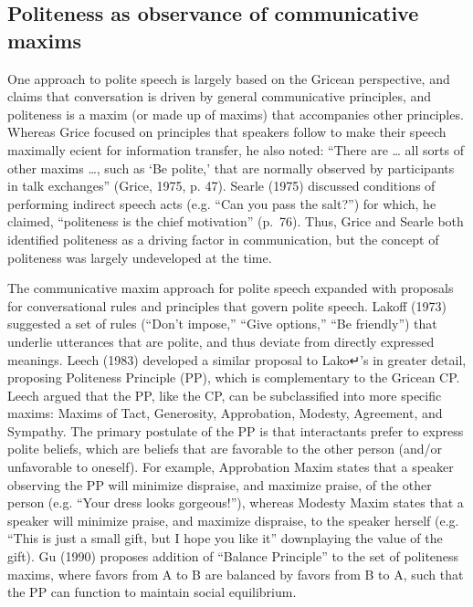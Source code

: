 \documentclass[oneside]{report}
\begin{document}
\subsection{Politeness as observance of communicative
maxims}\label{politeness-as-observance-of-communicative-maxims}

One approach to polite speech is largely based on the Gricean
perspective, and claims that conversation is driven by general
communicative principles, and politeness is a maxim (or made up of
maxims) that accompanies other principles. Whereas Grice focused on
principles that speakers follow to make their speech maximally ecient
for information transfer, he also noted: ``There are \ldots{} all sorts
of other maxims \ldots{}, such as `Be polite,' that are normally
observed by participants in talk exchanges'' (Grice, 1975, p. 47).
Searle (1975) discussed conditions of performing indirect speech acts
(e.g. ``Can you pass the salt?'') for which, he claimed, ``politeness is
the chief motivation'' (p.~76). Thus, Grice and Searle both identified
politeness as a driving factor in communication, but the concept of
politeness was largely undeveloped at the time.

The communicative maxim approach for polite speech expanded with
proposals for conversational rules and principles that govern polite
speech. Lakoff (1973) suggested a set of rules (``Don't impose,'' ``Give
options,'' ``Be friendly'') that underlie utterances that are polite,
and thus deviate from directly expressed meanings. Leech (1983)
developed a similar proposal to Lako↵'s in greater detail, proposing
Politeness Principle (PP), which is complementary to the Gricean CP.
Leech argued that the PP, like the CP, can be subclassified into more
specific maxims: Maxims of Tact, Generosity, Approbation, Modesty,
Agreement, and Sympathy. The primary postulate of the PP is that
interactants prefer to express polite beliefs, which are beliefs that
are favorable to the other person (and/or unfavorable to oneself). For
example, Approbation Maxim states that a speaker observing the PP will
minimize dispraise, and maximize praise, of the other person (e.g.
``Your dress looks gorgeous!''), whereas Modesty Maxim states that a
speaker will minimize praise, and maximize dispraise, to the speaker
herself (e.g. ``This is just a small gift, but I hope you like it''
downplaying the value of the gift). Gu (1990) proposes addition of
``Balance Principle'' to the set of politeness maxims, where favors from
A to B are balanced by favors from B to A, such that the PP can function
to maintain social equilibrium.
\end{document}
